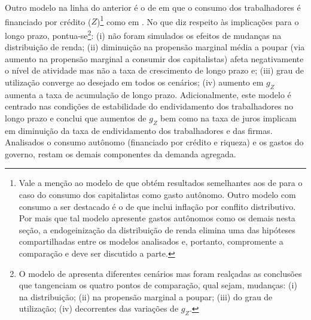 

Outro modelo na linha do anterior é o de \textcite{mandarino_financing_2018} em que o consumo dos trabalhadores é financiado por crédito ($Z$)\footnote{
	Vale a menção ao modelo de \textcite{lavoie_convergence_2016} que obtém resultados semelhantes aos de \textcite{allain_macroeconomic_2014} para o caso do consumo dos capitalistas como gasto autônomo. Outro modelo com consumo a ser destacado é o de \textcite{nah_role_2019} %
	que inclui inflação por conflito distributivo. Por mais que tal modelo apresente gastos autônomos como os demais nesta seção, a endogeinização da distribuição de renda elimina uma das hipóteses compartilhadas entre os modelos analisados e, portanto, compromente a comparação e deve ser discutido a parte.
} como em \textcite{fagundes_dinamica_2017}. No que diz respeito às implicações para o longo prazo, pontua-se\footnote{
	O modelo de \textcite{mandarino_financing_2018} apresenta diferentes cenários mas foram realçadas as conclusões que tangenciam os quatro pontos de comparação, qual sejam, mudanças: (i) na distribuição; (ii) na propensão marginal a poupar; (iii) do grau de utilização; (iv) decorrentes das variações de $g_Z$.
}: 
	(i) não foram simulados os efeitos de mudanças na distribuição de renda; 
	(ii) diminuição na propensão marginal média a poupar (via aumento na propensão marginal a consumir dos capitalistas) afeta negativamente o nível de atividade mas não a taxa de crescimento de longo prazo e; 
	(iii) grau de utilização converge ao desejado em todos os cenários; 
	(iv) aumento em $g_Z$ aumenta a taxa de acumulação de longo prazo.
Adicionalmente, este modelo é centrado nas condições de estabilidade do endividamento dos trabalhadores no longo prazo e conclui que aumentos de $g_Z$ bem como na taxa de juros implicam em diminuição da taxa de endividamento dos trabalhadores e das firmas. Analisados o consumo autônomo (financiado por crédito e riqueza) e os gastos do governo, restam os demais componentes da demanda agregada.



